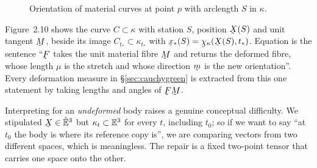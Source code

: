 \begin{figure}[htbp]\centering
{}
\caption{Orientation of material curves at point $p$ with arclength $S$ in $\kappa$.}
\label{fig:2.10}
\end{figure}

\begin{remark}\label{rem:fig10}
Figure~2.10 shows the curve $C\subset\kappa$ with station $S$, position
$\bX(S)$ and unit tangent $\bM$, beside its image $C_{t_*}\subset\kappa_{t_*}$
with $\bx_*(S)=\bchi_\kappa(\bX(S),t_*)$. Equation  is the sentence
``$\bF$ takes the unit material fibre $\bM$ and returns the deformed fibre,
whose length $\mu$ is the stretch and whose direction $\bmm$ is the new
orientation''. Every deformation measure in \S\ref{sec:cauchygreen} is
extracted from this one statement by taking lengths and angles of $\bF\bM$.
\end{remark}

\medskip
Interpreting  for an \emph{undeformed} body raises a genuine
conceptual difficulty. We stipulated $\bX\in\hVt$ but $\kappa_t\subset\mathbb{E}^{3}$
for every $t$, including $t_0$; so if we want to say ``at $t_0$ the body is
where its reference copy is'', we are comparing vectors from two different
spaces, which is meaningless. The repair is a fixed two-point tensor that
carries one space onto the other.

